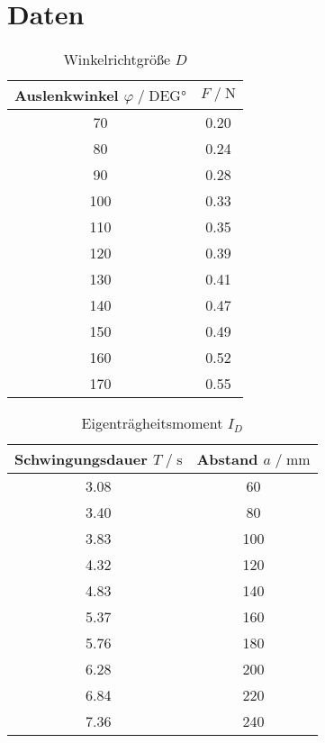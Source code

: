 \newpage
\section{Daten}
\label{sec:Daten}


\begin{table}
    \centering
    \caption{Winkelrichtgröße $D$}
    \label{tab:winkelrichtgroesse}
    \begin{tabular}{c c}
        \toprule
        Auslenkwinkel $ \varphi \;/\; \text{DEG}\si{\degree}$ & $F \;/\; \si{\newton}$ \\
        \midrule
        70 & 0.20 \\
        80 & 0.24 \\
        90 & 0.28 \\
        100 & 0.33 \\
        110 & 0.35 \\
        120 & 0.39 \\
        130 & 0.41 \\
        140 & 0.47 \\
        150 & 0.49 \\
        160 & 0.52 \\
        170 & 0.55 \\
        \bottomrule
    \end{tabular}
\end{table}


\begin{table}
   \centering
    \caption{Eigenträgheitsmoment $I_D$}
    \label{tab:eigentraegheitsmoment}
    \begin{tabular}{c c}
        \toprule
        Schwingungsdauer $ T \;/\; \si{\second}$ & Abstand $a \;/\; \si{\milli\meter}$ \\
        \midrule
        3.08 & 60 \\
        3.40 & 80 \\
        3.83 & 100 \\
        4.32 & 120 \\
        4.83 & 140 \\
        5.37 & 160 \\
        5.76 & 180 \\
        6.28 & 200 \\
        6.84 & 220 \\
        7.36 & 240 \\
        \bottomrule
    \end{tabular}
\end{table}


